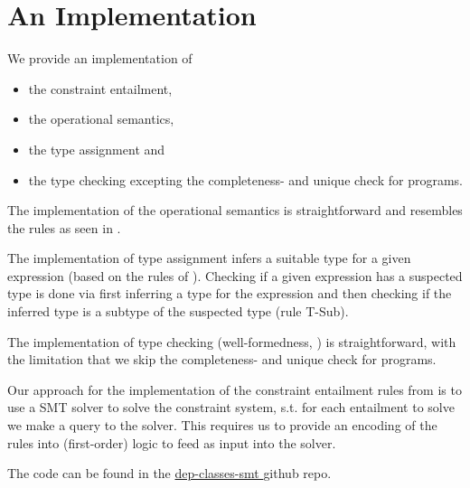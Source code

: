 \documentclass[a4paper]{article}
\begin{document}
\newpage
%
\section{An Implementation}
We provide an implementation of
\begin{itemize}
  \item the constraint entailment,
  \item the operational semantics,
  \item the type assignment and
  \item the type checking excepting the completeness- and unique check for programs.
\end{itemize}

The implementation of the operational semantics is straightforward and resembles
the rules as seen in .

The implementation of type assignment infers a suitable type for a given expression
(based on the rules of ).
Checking if a given expression has a suspected type is done via
first inferring a type for the expression and then checking if the inferred type
is a subtype of the suspected type (rule T-Sub).

The implementation of type checking (well-formedness, ) is straightforward,
with the limitation that we skip the completeness- and unique check for programs.

Our approach for the implementation of the constraint entailment rules
from  is to use a SMT solver to solve the constraint system,
s.t. for each entailment to solve we make a query to the solver.
This requires us to provide an encoding of the rules into (first-order) logic
to feed as input into the solver.

The code can be found in the
\href{https://github.com/stg-tud/dep-classes-smt/tree/master/paper/dep-classes/implementation}{
  dep-classes-smt
} github repo.
\end{document}
